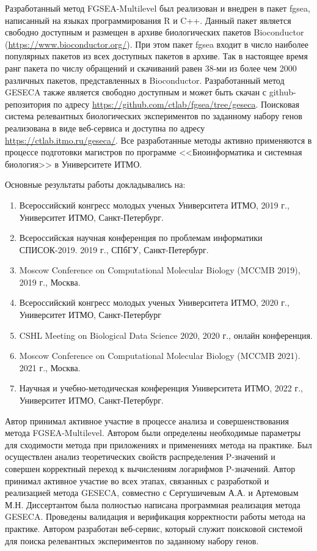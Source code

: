 {\integration} Разработанный метод FGSEA-Multilevel был реализован и внедрен в пакет fgsea, написанный на языках программирования R и C++. 
Данный пакет является свободно доступным и размещен в архиве биологических пакетов Bioconductor (\url{https://www.bioconductor.org/}).
При этом пакет fgsea входит в число наиболее популярных пакетов из всех доступных пакетов в архиве.
Так в настоящее время ранг пакета по числу обращений и скачиваний равен 38-ми из более чем 2000 различных пакетов, представленных в Bioconductor.
Разработанный метод GESECA также является свободно доступным и может быть скачан с github-репозитория по адресу \url{https://github.com/ctlab/fgsea/tree/geseca}. Поисковая система релевантных биологических экспериментов по заданному набору генов реализована в виде веб-сервиса и доступна по адресу \url{https://ctlab.itmo.ru/geseca/}. Все разработанные методы активно применяются в процессе подготовки магистров по программе <<Биоинформатика и системная биология>> в Университете ИТМО.


{\probation}
Основные результаты работы докладывались на:
\begin{enumerate}
    \item Всероссийский конгресс молодых ученых Университета ИТМО, 2019 г., Университет ИТМО, Санкт-Петербург.
    \item Всероссийская научная конференция по проблемам информатики СПИСОК-2019. 2019 г., СПбГУ, Санкт-Петербург.
    \item Moscow Conference on Computational Molecular Biology (MCCMB 2019), 2019 г., Москва.
    \item Всероссийский конгресс молодых ученых Университета ИТМО, 2020 г., Университет ИТМО, Санкт-Петербург
    \item CSHL Meeting on Biological Data Science 2020,  2020 г., онлайн конференция.
    \item Moscow Conference on Computational Molecular Biology (MCCMB 2021). 2021 г., Москва.
    \item Научная и учебно-методическая конференция Университета ИТМО, 2022 г., Университет ИТМО, Санкт-Петербург.
\end{enumerate}

{\contribution} Автор принимал активное участие в процессе анализа и совершенствования метода FGSEA-Multilevel. 
Автором были определены необходимые параметры для сходимости метода при приложениях и применениях метода на практике. 
Был осуществлен анализ теоретических свойств распределения P-значений и совершен корректный переход к вычислениям логарифмов P-значений.
Автор принимал активное участие во всех этапах, связанных с разработкой и реализацией метода GESECA, совместно с Сергушичевым А.А. и Артемовым М.Н.
Диссертантом была полностью написана программная реализация метода GESECA.
Проведены валидация и верификация корректности работы метода на практике.
Автором разработан веб-сервис, который служит поисковой системой для поиска релевантных экспериментов по заданному набору генов.

